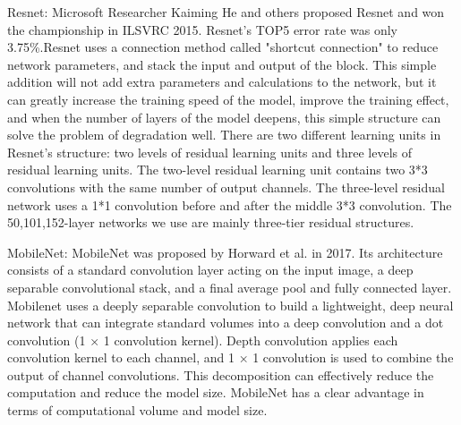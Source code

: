 Resnet: Microsoft Researcher Kaiming He and others proposed Resnet and won the championship in ILSVRC 2015. Resnet's TOP5 error rate was only 3.75\%.Resnet uses a connection method called "shortcut connection" to reduce network parameters, and stack the input and output of the block. This simple addition will not add extra parameters and calculations to the network, but it can greatly increase the training speed of the model, improve the training effect, and when the number of layers of the model deepens, this simple structure can solve the problem of degradation well. There are two different learning units in Resnet's structure: two levels of residual learning units and three levels of residual learning units. The two-level residual learning unit contains two 3*3 convolutions with the same number of output channels. The three-level residual network uses a 1*1 convolution before and after the middle 3*3 convolution. The 50,101,152-layer networks we use are mainly three-tier residual structures.


MobileNet: MobileNet was proposed by Horward et al. in 2017. Its architecture consists of a standard convolution layer acting on the input image, a deep separable convolutional stack, and a final average pool and fully connected layer. Mobilenet uses a deeply separable convolution to build a lightweight, deep neural network that can integrate standard volumes into a deep convolution and a dot convolution (1 × 1 convolution kernel). Depth convolution applies each convolution kernel to each channel, and 1 × 1 convolution is used to combine the output of channel convolutions. This decomposition can effectively reduce the computation and reduce the model size. MobileNet has a clear advantage in terms of computational volume and model size.





